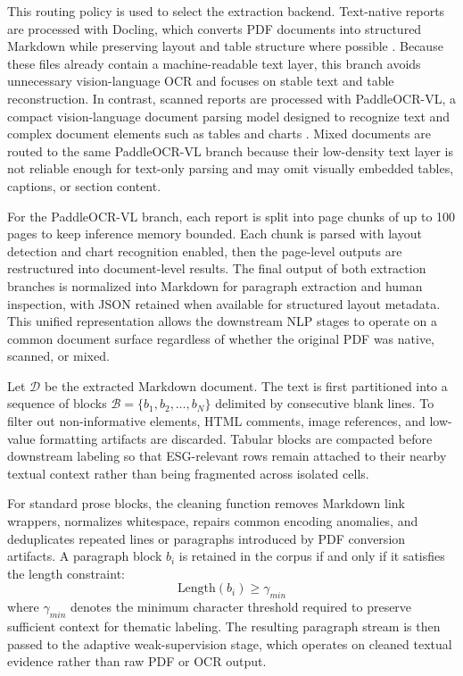 \documentclass{article}
\theoremstyle{plain}
\theoremstyle{definition}
\theoremstyle{remark}
\begin{document}


This routing policy is used to select the extraction backend. Text-native reports are processed with Docling, which converts PDF documents into structured Markdown while preserving layout and table structure where possible \citep{docling2024}. Because these files already contain a machine-readable text layer, this branch avoids unnecessary vision-language OCR and focuses on stable text and table reconstruction. In contrast, scanned reports are processed with PaddleOCR-VL, a compact vision-language document parsing model designed to recognize text and complex document elements such as tables and charts \citep{paddleocrvl2025}. Mixed documents are routed to the same PaddleOCR-VL branch because their low-density text layer is not reliable enough for text-only parsing and may omit visually embedded tables, captions, or section content.

For the PaddleOCR-VL branch, each report is split into page chunks of up to 100 pages to keep inference memory bounded. Each chunk is parsed with layout detection and chart recognition enabled, then the page-level outputs are restructured into document-level results. The final output of both extraction branches is normalized into Markdown for paragraph extraction and human inspection, with JSON retained when available for structured layout metadata. This unified representation allows the downstream NLP stages to operate on a common document surface regardless of whether the original PDF was native, scanned, or mixed.

Let $\mathcal{D}$ be the extracted Markdown document. The text is first partitioned into a sequence of blocks $\mathcal{B} = \{b_1, b_2, \dots, b_N\}$ delimited by consecutive blank lines. To filter out non-informative elements, HTML comments, image references, and low-value formatting artifacts are discarded. Tabular blocks are compacted before downstream labeling so that ESG-relevant rows remain attached to their nearby textual context rather than being fragmented across isolated cells.

For standard prose blocks, the cleaning function removes Markdown link wrappers, normalizes whitespace, repairs common encoding anomalies, and deduplicates repeated lines or paragraphs introduced by PDF conversion artifacts. A paragraph block $b_i$ is retained in the corpus if and only if it satisfies the length constraint:
\begin{equation}
\text{Length}(b_i) \geq \gamma_{min}
\end{equation}
where $\gamma_{min}$ denotes the minimum character threshold required to preserve sufficient context for thematic labeling. The resulting paragraph stream is then passed to the adaptive weak-supervision stage, which operates on cleaned textual evidence rather than raw PDF or OCR output.
\end{document}
